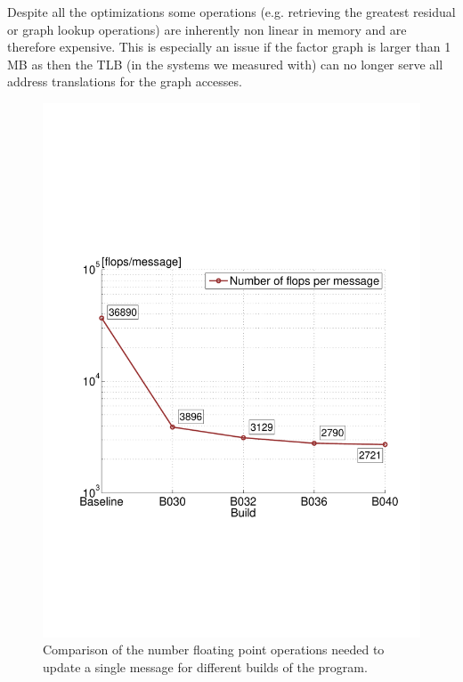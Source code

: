 Despite all the optimizations some operations (e.g. retrieving the greatest residual or graph lookup operations) are inherently non linear in memory and are therefore expensive. This is especially an issue if the factor graph is larger than 1 MB as then the TLB (in the systems we measured with) can no longer serve all address translations for the graph accesses.

\begin{figure}\centering
    \includegraphics[scale=0.48, trim={2cm 6.5cm 1cm 8.5cm},clip]{graphics/flops_per_message.pdf}
  \caption{Comparison of the number floating point operations needed to update a single message for different builds of the program.\label{flops-per-message}}
\end{figure}

